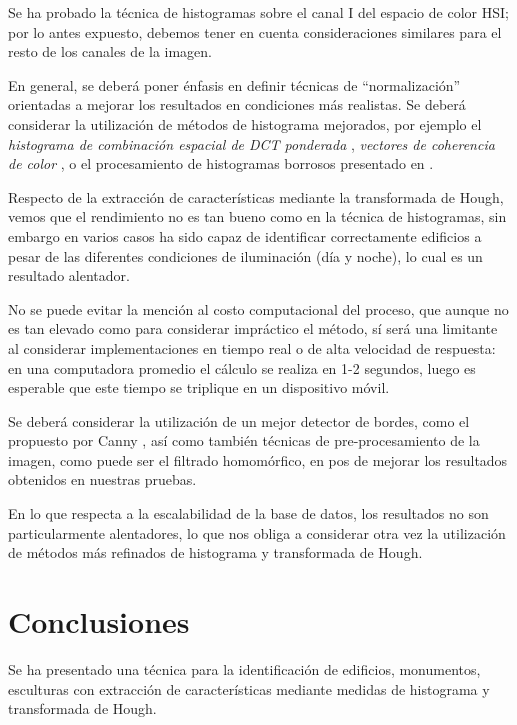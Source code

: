 \documentclass[conference,a4paper,10pt,oneside,final]{tfmpd}
\begin{document}
Se ha probado la técnica de histogramas sobre el canal I del espacio de color
HSI; por lo antes expuesto, debemos tener en cuenta consideraciones similares
para el resto de los canales de la imagen.

En general, se deberá poner énfasis en definir técnicas
de ``normalización'' orientadas a mejorar los resultados en condiciones más
realistas. Se deberá considerar la utilización de métodos de histograma
mejorados, por ejemplo el \emph{histograma de combinación espacial de DCT
ponderada} \cite{wdctsch}, \emph{vectores de coherencia de
color} \cite{Pass96histogramrefinement}, o el procesamiento de
histogramas borrosos presentado en \cite{Konstantinidis2005375}.

Respecto de la extracción de características mediante la transformada de Hough,
vemos que el rendimiento no es tan bueno como en la técnica de histogramas,
sin embargo en varios casos ha sido capaz de identificar correctamente edificios
a pesar de las diferentes condiciones de iluminación (día y noche), lo cual
es un resultado alentador.

No se puede evitar la mención al costo computacional del proceso, que aunque
no es tan elevado como para considerar impráctico el método, sí será una
limitante al considerar implementaciones en tiempo real o de alta velocidad
de respuesta: en una computadora promedio el cálculo se realiza en 1-2 segundos,
luego es esperable que este tiempo se triplique en un dispositivo móvil.

Se deberá considerar la utilización de un mejor detector de bordes, como el
propuesto por Canny \cite{canny}%
, así como también técnicas de pre-procesamiento de la
imagen, como puede ser el filtrado homomórfico, en pos de mejorar los
resultados obtenidos en nuestras pruebas.

En lo que respecta a la escalabilidad de la base de datos, los resultados no
son particularmente alentadores, lo que nos obliga a considerar otra vez la
utilización de métodos más refinados de histograma y transformada de Hough.
%
%
%
%
\section{Conclusiones}
Se ha presentado una técnica para la identificación de edificios, monumentos,
esculturas con extracción de características mediante medidas de histograma
y transformada de Hough.
\end{document}
